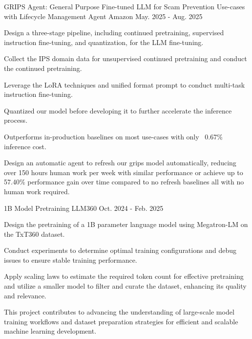 
\begin{cventries}
	\cventry
	{} %
	{GRIPS Agent: General Purpose Fine-tuned LLM for Scam Prevention
Use-cases with Lifecycle Management Agent} %
	{Amazon} %
	{May. 2025 - Aug. 2025} %
	{
		\begin{cvitems} %
            \item Design a three-stage pipeline, including continued pretraining, supervised instruction fine-tuning, and quantization, for the LLM fine-tuning.
		\item Collect the IPS domain data for unsupervised continued pretraining and conduct the continued pretraining.
            \item Leverage the LoRA techniques and unified format prompt to conduct multi-task instruction fine-tuning.
            \item Quantized our model before developing it to further accelerate the inference process.
            \item Outperforms in-production baselines on most use-cases with only ~0.67\% inference cost.
            \item Design an automatic agent to refresh our grips model automatically, reducing over 150 hours human work per week with similar performance or achieve up to 57.40\% performance gain over time compared to no refresh baselines all with no human work required.
		\end{cvitems}
		\vspace{2mm}
	}

	\cventry
	{} %
	{1B Model Pretraining} %
	{LLM360} %
	{Oct. 2024 - Feb. 2025} %
	{
		\begin{cvitems} %
		\item Design the pretraining of a 1B parameter language model using Megatron-LM on the TxT360 dataset.
            \item Conduct experiments to determine optimal training configurations and debug issues to ensure stable training performance.
            \item Apply scaling laws to estimate the required token count for effective pretraining and utilize a smaller model to filter and curate the dataset, enhancing its quality and relevance.
            \item This project contributes to advancing the understanding of large-scale model training workflows and dataset preparation strategies for efficient and scalable machine learning development.
		\end{cvitems}
		\vspace{2mm}
	}
    

\end{cventries}
